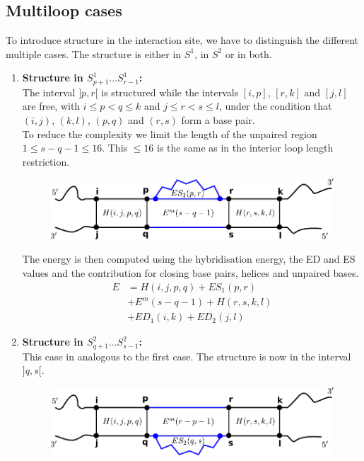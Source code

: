 \documentclass[11pt,a4paper]{report}
\newcommand{\seq}{S} %
\begin{document}
\subsection*{Multiloop cases}
To introduce structure in the interaction site, we have to distinguish the different multiple cases. The structure is either in $\seq^1$, in $\seq^2$ or in both.\\
\begin{enumerate}
\item \textbf{Structure in $\seq^1_{p+1} ... \seq^1_{r-1}$:}\\
The interval $]p,r[$ is structured while the intervals $[i,p]$, $[r,k]$ and $[j,l]$ are free, with $i \leq p < q \leq k$ and $j \leq r < s \leq l$, under the condition that $(i,j)$, $(k,l)$, $(p,q)$ and $(r,s)$ form a base pair.\\
To reduce the complexity we limit the length of the unpaired region $1 \leq s-q-1 \leq 16$. This $\leq 16$ is the same as in the interior loop length restriction.\\
\begin{figure}[H]
\centering
\includegraphics[scale=0.75]{RNAi1.pdf}
\end{figure}
The energy is then computed using the hybridisation energy, the ED and ES values and the contribution for closing base pairs, helices and unpaired bases.\\
\begin{align*}
E &= H(i,j,p,q) + ES_1(p,r)\\
 &+ E^m(s-q-1) + H(r,s,k,l)\\
 &+ ED_1(i,k) + ED_2(j,l)
\end{align*}
\item \textbf{Structure in $\seq^2_{q+1} ... \seq^2_{s-1}$:}\\
This case in analogous to the first case. The structure is now in the interval $]q,s[$.
\begin{figure}[H]
\centering
\includegraphics[scale=0.75]{RNAi3.pdf}

\end{figure}
\end{enumerate}
\end{document}
